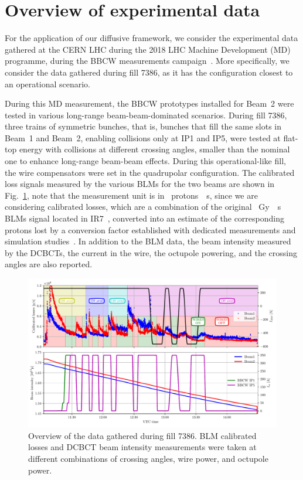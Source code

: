 \section{Overview of experimental data}\label{sec:5:wire-data}

For the application of our diffusive framework, we consider the experimental data gathered at the CERN LHC during the 2018 LHC Machine Development (MD) programme, during the BBCW measurements campaign~\cite{Poyet:2703503}. More specifically, we consider the data gathered during fill 7386, as it has the configuration closest to an operational scenario.

During this MD measurement, the BBCW prototypes installed for Beam~2 were tested in various long-range beam-beam-dominated scenarios. During fill 7386, three trains of symmetric bunches, that is, bunches that fill the same slots in Beam~1 and Beam~2, enabling collisions only at IP1 and IP5, were tested at flat-top energy with collisions at different crossing angles, smaller than the nominal one to enhance long-range beam-beam effects. During this operational-like fill, the wire compensators were set in the quadrupolar configuration. The calibrated loss signals measured by the various BLMs for the two beams are shown in Fig.~\ref{fig:wire-data}, note that the measurement unit is in \SI{}{protons \per s}, since we are considering calibrated losses, which are a combination of the original \SI{}{Gy \per s} BLMs signal located in IR7~\cite{blmcalibratedlosses}, converted into an estimate of the corresponding protons lost by a conversion factor established with dedicated measurements and simulation studies~\cite{4439981}. In addition to the BLM data, the beam intensity measured by the DCBCTs, the current in the wire, the octupole powering, and the crossing angles are also reported. 

\begin{figure}[th]
    \centering
    \includegraphics[width=1.0\textwidth]{5_wire_compensators_LHC/figs/wire_summary.pdf}
    \caption{Overview of the data gathered during fill 7386. BLM calibrated losses and DCBCT beam intensity measurements were taken at different combinations of crossing angles, wire power, and octupole power.}
    \label{fig:wire-data}
\end{figure}

